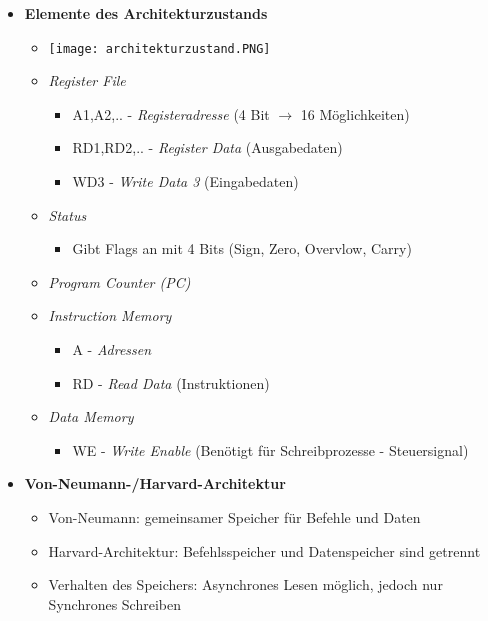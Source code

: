 \begin{itemize}
\begin{itemize}
            \end{itemize}
        \item \textbf{Elemente des Architekturzustands}
            \begin{itemize}
                \item[] \texttt{[image: architekturzustand.PNG]}
                \item \textit{Register File}
                    \begin{itemize}
                        \item A1,A2,.. - \textit{Registeradresse} (4 Bit $\rightarrow$ 16 Möglichkeiten)
                        \item RD1,RD2,.. - \textit{Register Data} (Ausgabedaten)
                        \item WD3 - \textit{Write Data 3} (Eingabedaten)
                    \end{itemize}
                \item \textit{Status}
                    \begin{itemize}
                        \item Gibt Flags an mit 4 Bits (Sign, Zero, Overvlow, Carry)
                    \end{itemize}
                \item \textit{Program Counter (PC)}
                \item \textit{Instruction Memory}
                    \begin{itemize}
                        \item A - \textit{Adressen}
                        \item RD - \textit{Read Data} (Instruktionen)
                    \end{itemize}
                \item \textit{Data Memory}
                    \begin{itemize}
                        \item WE - \textit{Write Enable} (Benötigt für Schreibprozesse - Steuersignal)
                    \end{itemize}
            \end{itemize}

        \item \textbf{Von-Neumann-/Harvard-Architektur}
            \begin{itemize}
                \item Von-Neumann: gemeinsamer Speicher für Befehle und Daten
                \item Harvard-Architektur: Befehlsspeicher und Datenspeicher sind getrennt
                \item Verhalten des Speichers: Asynchrones Lesen möglich, jedoch nur Synchrones Schreiben
            \end{itemize}


\end{itemize}
